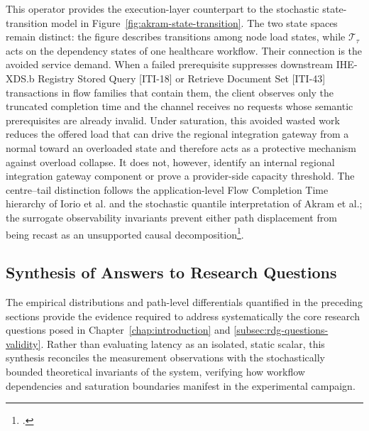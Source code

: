 \noindent This operator provides the execution-layer counterpart to the stochastic
state-transition model in Figure~\ref{fig:akram-state-transition}. The two
state spaces remain distinct: the figure describes transitions among node load
states, while $\mathcal{T}_{\tau}$ acts on the dependency states of one
healthcare workflow. Their connection is the avoided service demand. When a
failed prerequisite suppresses downstream IHE-XDS.b Registry Stored Query
[ITI-18] or Retrieve Document Set [ITI-43] transactions in flow families that
contain them, the client observes only the truncated completion time and the
channel receives no requests whose semantic prerequisites are already invalid.
Under saturation, this avoided wasted work reduces the offered load that can
drive the regional integration gateway from a normal toward an overloaded state and therefore acts
as a protective mechanism against overload collapse. It does not, however,
identify an internal regional integration gateway component or prove a provider-side capacity
threshold. The centre--tail distinction follows the application-level Flow
Completion Time hierarchy of Iorio et al. and the stochastic quantile
interpretation of Akram et al.; the surrogate observability invariants prevent
either path displacement from being recast as an unsupported causal
decomposition\footcite{iorio-when-latency-matters,akram-numerical-latency}.

\subsection{Synthesis of Answers to Research Questions}
\label{subsec:rdg-interpretation-closure}

\noindent The empirical distributions and path-level differentials quantified in the
preceding sections provide the evidence required to address systematically the
core research questions posed in Chapter~\ref{chap:introduction} and \ref{subsec:rdg-questions-validity}. Rather than
evaluating latency as an isolated, static scalar, this synthesis reconciles the
measurement observations with the stochastically bounded theoretical invariants
of the system, verifying how workflow dependencies and saturation boundaries
manifest in the experimental campaign.

